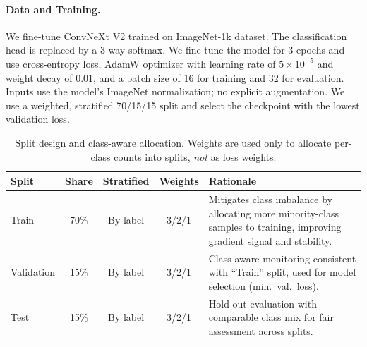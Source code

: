 
\paragraph{Data and Training.} We fine-tune ConvNeXt V2 trained on ImageNet-1k dataset. The classification head is replaced by a 3-way softmax. We fine-tune the model for 3 epochs and use cross-entropy loss, AdamW optimizer with learning rate of $5\times10^{-5}$ and weight decay of 0.01, and a batch size of 16 for training and 32 for evaluation. Inputs use the model’s ImageNet normalization; no explicit augmentation. We use a weighted, stratified 70/15/15 split and select the checkpoint with the lowest validation loss.

\begin{table}[h!]
\centering
\small
\begin{tabular}{lccc p{6.8cm}}
\toprule
\textbf{Split} & \textbf{Share} & \textbf{Stratified} & \textbf{Weights} & \textbf{Rationale} \\
\midrule
Train       & 70\% & By label & 3/2/1 & Mitigates class imbalance by allocating more minority-class samples to training, improving gradient signal and stability. \\
Validation  & 15\% & By label & 3/2/1 & Class-aware monitoring consistent with ``Train'' split, used for model selection (min.\ val.\ loss). \\
Test        & 15\% & By label & 3/2/1 & Hold-out evaluation with comparable class mix for fair assessment across splits. \\
\bottomrule
\end{tabular}
\caption{Split design and class-aware allocation. Weights are used only to allocate per-class counts into splits, \emph{not} as loss weights.}
\label{tab:splits}
\end{table}


